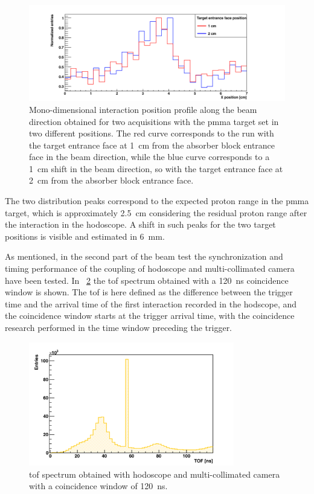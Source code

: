 \begin{figure}[!htbp]
\centering
\hspace{-1.5cm} \includegraphics[width=1.1\textwidth]{03_GraphicFiles/chapter6_BeamTests/Nice_September2018/profile_compl.png}
\caption{Mono-dimensional interaction position profile along the beam direction obtained for two acquisitions with the \gls{pmma} target set in two different positions. The red curve corresponds to the run with the target entrance face at 1~cm from the absorber block entrance face in the beam direction, while the blue curve corresponds to a 1~cm shift in the beam direction, so with the target entrance face at 2~cm from the absorber block entrance face.}
\label{chap6::fig::september_profiles}
\end{figure}

The two distribution peaks correspond to the expected proton range in the \gls{pmma} target, which is approximately 2.5~cm considering the residual proton range after the interaction in the hodoscope. A shift in such peaks for the two target positions is visible and estimated in 6~mm. 

As mentioned, in the second part of the beam test the synchronization and timing performance of the coupling of hodoscope and multi-collimated camera have been tested. In \figurename~\ref{chap6::fig::september_TOF} the \gls{tof} spectrum obtained with a 120~ns coincidence window is shown. The \gls{tof} is here defined as the difference between the trigger time and the arrival time of the first interaction recorded in the hodscope, and the coincidence window starts at the trigger arrival time, with the coincidence research performed in the time window preceding the trigger.

\begin{figure}[!htbp]
\centering
\includegraphics[width=0.8\textwidth]{03_GraphicFiles/chapter6_BeamTests/Nice_September2018/TOF_0-120ns_rev_fill_lessBins.png}
\caption{\gls{tof} spectrum obtained with hodoscope and multi-collimated camera with a coincidence window of 120~ns.}
\label{chap6::fig::september_TOF}
\end{figure}

